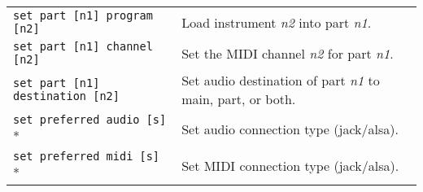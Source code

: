 \begin{table}[H]
\begin{tabular}{l l}
         \texttt{set part [n1] program [n2]} &
            Load instrument \textsl{n2} into part \textsl{n1}. \\

         \texttt{set part [n1] channel [n2]} &
            Set the MIDI channel \textsl{n2} for part \textsl{n1}. \\

         \texttt{set part [n1] destination [n2]} &
            Set audio destination of part \textsl{n1}
            to main, part, or both. \\

         \texttt{set preferred audio [s]} * &
            Set audio connection type (jack/alsa). \\

         \texttt{set preferred midi [s]} * &
            Set MIDI connection type (jack/alsa). \\

      \end{tabular}
   \end{table}

